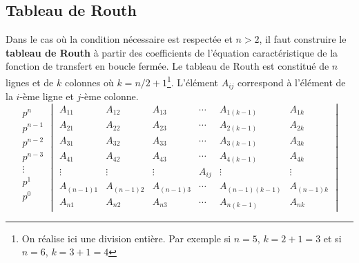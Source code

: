 \subsection{Tableau de Routh}
Dans le cas où la condition nécessaire est respectée et $n>2$, il faut 
construire le \textbf{tableau de Routh} à partir des coefficients de l'équation 
caractéristique de la fonction de transfert en boucle fermée.
\newpage
\restoregeometry
\captionsetup{width=0.9\linewidth}
Le tableau de Routh est constitué de $n$ lignes et de $k$ colonnes 
où $k=n/2+1$\footnote{On réalise ici une division entière. Par exemple 
si $n=5$, $k=2+1=3$ et si $n=6$, $k=3+1=4$}. L'élément $A_{ij}$ correspond 
à l'élément de la $i$-ème ligne et $j$-ème colonne.
\[
\begin{matrix}
    p^n    \\
    p^{n-1}\\
    p^{n-2}\\
    p^{n-3}\\
    \vdots \\
    p^1    \\
    p^0    \\
\end{matrix}
\begin{vmatrix}
  A_{11}     & A_{12}     & A_{13}     & \cdots & A_{1(k-1)}     & A_{1k}  \\
  A_{21}     & A_{22}     & A_{23}     & \cdots & A_{2(k-1)}     & A_{2k}  \\
  A_{31}     & A_{32}     & A_{33}     & \cdots & A_{3(k-1)}     & A_{3k}  \\
  A_{41}     & A_{42}     & A_{43}     & \cdots & A_{4(k-1)}     & A_{4k}  \\
  \vdots     & \vdots     & \vdots     & A_{ij} & \vdots         & \vdots  \\
  A_{(n-1)1} & A_{(n-1)2} & A_{(n-1)3} & \cdots & A_{(n-1)(k-1)} & A_{(n-1)k}\\
  A_{n1}     & A_{n2}     & A_{n3}     & \cdots & A_{n(k-1)}     & A_{nk}
\end{vmatrix}
\]

